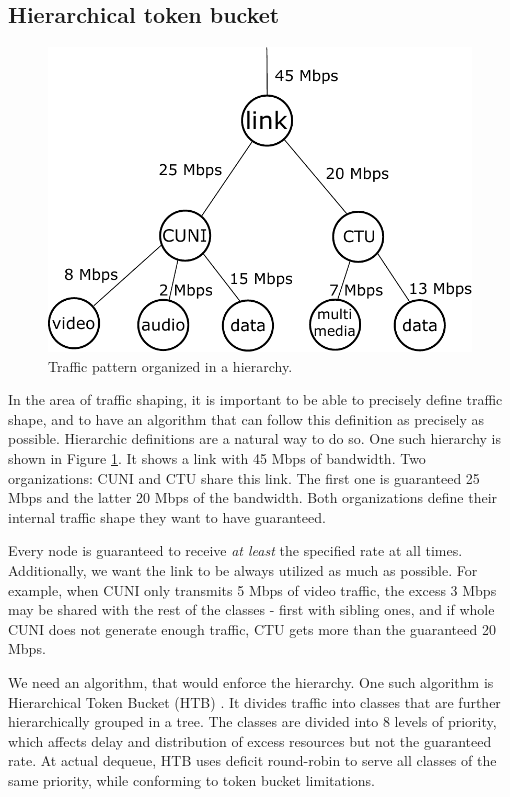 \subsection{Hierarchical token bucket}
\begin{figure}
	\centering
	\includegraphics[width=137mm]{drawings/hierarchy}
	\caption{Traffic pattern organized in a hierarchy.}
	
	\label{fig10:hierarchy}
\end{figure}
In the area of traffic shaping, it is important to be able to precisely define traffic shape, and to have an algorithm that can follow this definition as precisely as possible. Hierarchic definitions are a natural way to do so. One such hierarchy is shown in Figure \ref{fig10:hierarchy}. It shows a link with 45 Mbps of bandwidth. Two organizations: CUNI and CTU share this link. The first one is guaranteed 25 Mbps and the latter 20 Mbps of the bandwidth. Both organizations define their internal traffic shape they want to have guaranteed.

Every node is guaranteed to receive \textit{at least} the specified rate at all times. Additionally, we want the link to be always utilized as much as possible. For example, when CUNI only transmits 5 Mbps of video traffic, the excess 3 Mbps may be shared with the rest of the classes - first with sibling ones, and if whole CUNI does not generate enough traffic, CTU gets more than the guaranteed 20 Mbps.


We need an algorithm, that would enforce the hierarchy. One such algorithm is Hierarchical Token Bucket (HTB) \cite{HTB}. It divides traffic into classes that are further hierarchically grouped in a tree. The classes are divided into 8 levels of priority, which affects delay and distribution of excess resources but not the guaranteed rate. At actual dequeue, HTB uses deficit round-robin to serve all classes of the same priority, while conforming to token bucket limitations.

